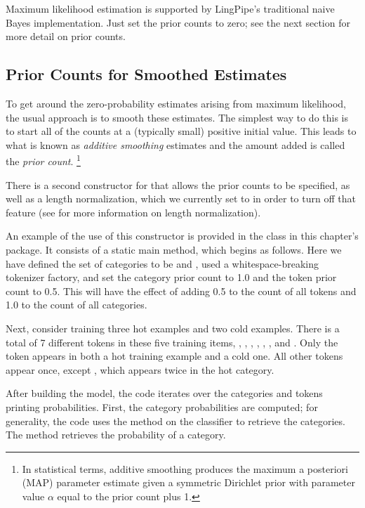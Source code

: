 Maximum likelihood estimation is supported by LingPipe's traditional
naive Bayes implementation.  Just set the prior counts to zero; see
the next section for more detail on prior counts.

\subsection{Prior Counts for Smoothed Estimates}

To get around the zero-probability estimates arising from maximum
likelihood, the usual approach is to smooth these estimates.  The
simplest way to do this is to start all of the counts at a (typically
small) positive initial value.  This leads to what is known as {\it
  additive smoothing} estimates and the amount added is
called the {\it prior count}.%
%
\footnote{In statistical terms, additive smoothing produces the
  maximum a posteriori (MAP) parameter estimate given a symmetric
  Dirichlet prior with parameter value $\alpha$ equal to the prior
  count plus 1.}
%

There is a second constructor for  that
allows the prior counts to be specified, as well as a length normalization,
which we currently set to  in order to turn off that
feature (see  for more information on
length normalization).  

An example of the use of this constructor is provided in the
class  in this chapter's package.  It consists
of a static main method, which begins as follows.
%
%
Here we have defined the set of categories to be 
and , used a whitespace-breaking tokenizer factory,
and set the category prior count to 1.0 and the token prior count to 0.5.
This will have the effect of adding 0.5 to the count of all tokens and
1.0 to the count of all categories.

Next, consider training three hot examples and two cold examples.
%
%
There is a total of 7 different tokens in these five training items,
, , ,
, ,
, and .  Only the token
 appears in both a hot training example and a cold one.
All other tokens appear once, except ,
which appears twice in the hot category.

After building the model, the code iterates over the categories and
tokens printing probabilities.  First, the category probabilities
are computed; for generality, the code uses the method 
on the classifier to retrieve the categories.
%
%
The method  retrieves the probability of a category.

